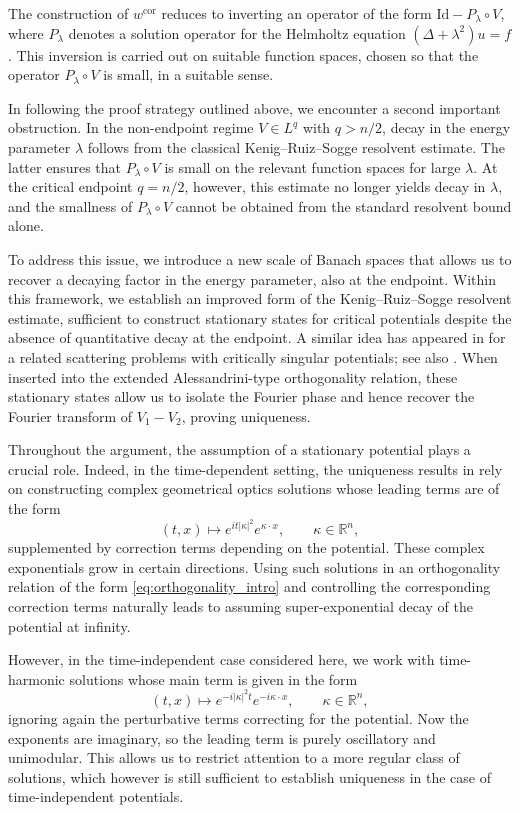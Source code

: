 \documentclass[11pt,a4paper]{amsart}
\theoremstyle{remark}
\theoremstyle{definition}
\newcommand{\R}{\mathbb{R}}
\begin{document}
The construction of \(w^{\mathrm{cor}}\) reduces to inverting an operator of the form \(\mathrm{Id}-P_\lambda\circ V\), where \(P_\lambda\) denotes a solution operator for the Helmholtz equation \((\Delta+\lambda^2)u=f\). This inversion is carried out on suitable function spaces, chosen so that the operator \(P_\lambda\circ V\) is small, in a suitable sense.

In following the proof strategy outlined above, we encounter a second important obstruction. In the non-endpoint regime $V\in L^q$ with $q>n/2$, decay in the energy parameter $\lambda$ follows from the classical Kenig--Ruiz--Sogge resolvent estimate. The latter ensures that $P_\lambda\circ V$ is small on the relevant function spaces for large $\lambda$. At the critical endpoint $q=n/2$, however, this estimate no longer yields decay in $\lambda$, and the smallness of $P_\lambda\circ V$ cannot be obtained from the standard resolvent bound alone.

To address this issue, we introduce a new scale of Banach spaces that allows us to recover a decaying factor in the energy parameter, also at the endpoint. Within this framework, we establish an improved form of the Kenig--Ruiz--Sogge resolvent estimate, sufficient to construct stationary states for critical potentials despite the absence of quantitative decay at the endpoint. A similar idea has appeared in \cite{CaroGarcia} for a related scattering problems with critically singular potentials; see also \cite{zbMATH07867333}. When inserted into the extended Alessandrini-type orthogonality relation, these stationary states allow us to isolate the Fourier phase and hence recover the Fourier transform of $V_1-V_2$, proving uniqueness.

Throughout the argument, the assumption of a stationary potential plays a crucial role. Indeed, in the time-dependent setting, the uniqueness results in \cites{zbMATH07801151,caro2025initialtofinalstateinverseproblemunbounded} rely on constructing complex geometrical optics solutions whose leading terms are of the form
\[
(t,x) \longmapsto e^{it|\kappa|^2} e^{\kappa\cdot x}, \qquad \kappa \in \R^n,
\]
supplemented by correction terms depending on the potential. These complex exponentials grow in certain directions.  Using such solutions in an orthogonality relation of the form \eqref{eq:orthogonality_intro} and controlling the corresponding correction terms naturally leads to assuming super-exponential decay of the potential at infinity.

However, in the time-independent case considered here, we work with time-harmonic solutions whose main term is given in the form
\[
(t,x) \longmapsto e^{-i|\kappa|^2 t} e^{-i\kappa\cdot x}, \qquad \kappa \in \R^n,
\]
ignoring again the perturbative terms correcting for the potential. Now the exponents are imaginary, so the leading term is purely oscillatory and unimodular. This allows us to restrict attention to a more regular class of solutions, which however is still sufficient to establish uniqueness in the case of time-independent potentials.
\end{document}
